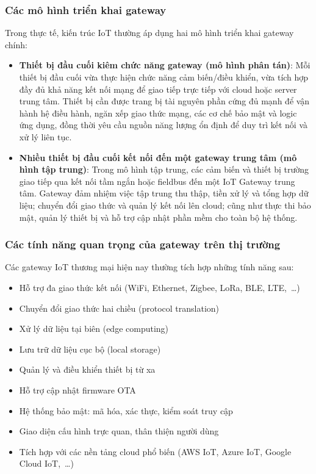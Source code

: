         \subsubsection{Các mô hình triển khai gateway}
            Trong thực tế, kiến trúc IoT thường áp dụng hai mô hình triển khai gateway chính:
            \begin{itemize}
                \item \textbf{Thiết bị đầu cuối kiêm chức năng gateway (mô hình phân tán)}: Mỗi thiết bị đầu cuối vừa thực hiện chức năng cảm biến/điều khiển, vừa tích hợp đầy đủ khả năng kết nối mạng để giao tiếp trực tiếp với cloud hoặc server trung tâm. Thiết bị cần được trang bị tài nguyên phần cứng đủ mạnh để vận hành hệ điều hành, ngăn xếp giao thức mạng, các cơ chế bảo mật và logic ứng dụng, đồng thời yêu cầu nguồn năng lượng ổn định để duy trì kết nối và xử lý liên tục.
                \item \textbf{Nhiều thiết bị đầu cuối kết nối đến một gateway trung tâm (mô hình tập trung)}: Trong mô hình tập trung, các cảm biến và thiết bị trường giao tiếp qua kết nối tầm ngắn hoặc fieldbus đến một IoT Gateway trung tâm. Gateway đảm nhiệm việc tập trung thu thập, tiền xử lý và tổng hợp dữ liệu; chuyển đổi giao thức và quản lý kết nối lên cloud; cũng như thực thi bảo mật, quản lý thiết bị và hỗ trợ cập nhật phần mềm cho toàn bộ hệ thống.
            \end{itemize}

        \subsubsection{Các tính năng quan trọng của gateway trên thị trường}
            Các gateway IoT thương mại hiện nay thường tích hợp những tính năng sau:
            \begin{itemize}
                \item Hỗ trợ đa giao thức kết nối (WiFi, Ethernet, Zigbee, LoRa, BLE, LTE,~\ldots)
                \item Chuyển đổi giao thức hai chiều (protocol translation)
                \item Xử lý dữ liệu tại biên (edge computing)
                \item Lưu trữ dữ liệu cục bộ (local storage)
                \item Quản lý và điều khiển thiết bị từ xa
                \item Hỗ trợ cập nhật firmware OTA
                \item Hệ thống bảo mật: mã hóa, xác thực, kiểm soát truy cập
                \item Giao diện cấu hình trực quan, thân thiện người dùng
                \item Tích hợp với các nền tảng cloud phổ biến (AWS IoT, Azure IoT, Google Cloud IoT,~\ldots)
            \end{itemize}

